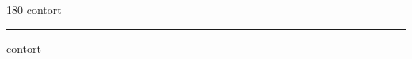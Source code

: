 
\begin{frame}
\begin{center}
\begin{turn}{180}
{\fontsize{2.5cm}{1em}\selectfont contort}
\end{turn}
\vspace{1em}\par  
\hrule
\vspace{1em}\par  
{\fontsize{2.5cm}{1em}\selectfont contort}
\end{center}
\end{frame}
